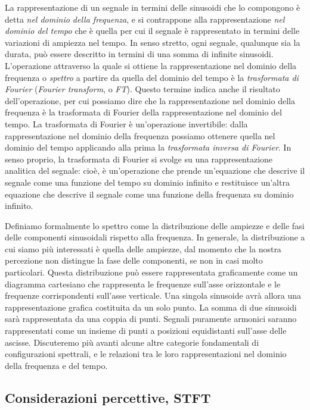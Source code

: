 \documentclass[11pt]{report}
\begin{document}
La rappresentazione di un segnale in termini delle sinusoidi che lo compongono è detta \emph{nel dominio della frequenza}, e si contrappone alla rappresentazione \emph{nel dominio del tempo} che è quella per cui il segnale è rappresentato in termini delle variazioni di ampiezza nel tempo. In senso stretto, ogni segnale, qualunque sia la durata, può essere descritto in termini di una somma di infinite sinusoidi. L'operazione attraverso la quale si ottiene la rappresentazione nel dominio della frequenza o \emph{spettro} a partire da quella del dominio del tempo è la \emph{trasformata di Fourier} (\emph{Fourier transform}, o \emph{FT}). Questo termine indica anche il risultato dell'operazione, per cui possiamo dire che la rappresentazione nel dominio della frequenza è la trasformata di Fourier della rappresentazione nel dominio del tempo. La trasformata di Fourier è un'operazione invertibile: dalla rappresentazione nel dominio della frequenza possiamo ottenere quella nel dominio del tempo applicando alla prima la \emph{trasformata inversa di Fourier}. In senso proprio, la trasformata di Fourier si svolge su una rappresentazione analitica del segnale: cioè, è un'operazione che prende un'equazione che descrive il segnale come una funzione del tempo su dominio infinito e restituisce un'altra equazione che descrive il segnale come una funzione della frequenza su dominio infinito.

Definiamo formalmente lo spettro come la distribuzione delle ampiezze e delle fasi delle componenti sinusoidali rispetto alla frequenza. In generale, la distribuzione a cui siamo più interessati è quella delle ampiezze, dal momento che la nostra percezione non distingue la fase delle componenti, se non in casi molto particolari. Questa distribuzione può essere rappresentata graficamente come un diagramma cartesiano che rappresenta le frequenze sull'asse orizzontale e le frequenze corrispondenti sull'asse verticale. Una singola sinusoide avrà allora una rappresentazione grafica costituita da un solo punto. La somma di due sinusoidi sarà rappresentata da una coppia di punti. Segnali puramente armonici saranno rappresentati come un insieme di punti a posizioni equidistanti sull'asse delle ascisse. Discuteremo più avanti alcune altre categorie fondamentali di configurazioni spettrali, e le relazioni tra le loro rappresentazioni nel dominio della frequenza e del tempo.


 
\subsection{Considerazioni percettive, STFT}
\end{document}
